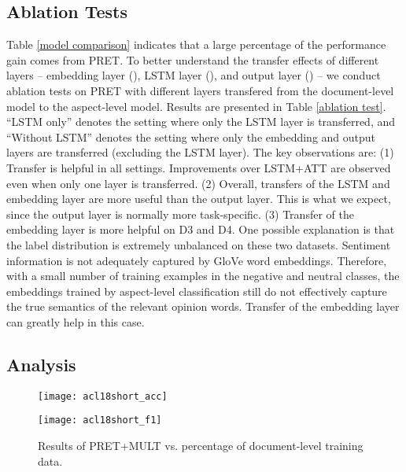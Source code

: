 \documentclass[11pt,a4paper]{article}
\begin{document}
\subsection{Ablation Tests}
Table \ref{model comparison} indicates that a large percentage of the performance gain comes from PRET. To better understand the transfer effects of different layers -- embedding layer (), LSTM layer (), and output layer () -- we conduct ablation tests on PRET with different layers transfered from the document-level model to the aspect-level model. Results are presented in Table \ref{ablation test}. ``LSTM only'' denotes the setting where only the LSTM layer is transferred, and ``Without LSTM'' denotes the setting where only the embedding and output layers are transferred (excluding the LSTM layer). The key observations are: (1) Transfer is helpful in all settings. Improvements over LSTM+ATT are observed even when only one layer is transferred. (2) Overall, transfers of the LSTM and embedding layer are more useful than the output layer. This is what we expect, since the output layer is normally more task-specific. 
(3) Transfer of the embedding layer is more helpful on D3 and D4. One possible explanation is that the label distribution is extremely unbalanced on these two datasets. Sentiment information is not adequately captured by GloVe word embeddings. Therefore, with a small number of training examples in the negative and neutral classes, the embeddings trained by aspect-level classification still do not effectively capture the true semantics of the relevant opinion words. Transfer of the embedding layer can greatly help in this case.

\subsection{Analysis}

\begin{figure}[t]
  \centering
  \begin{minipage}[b]{0.37\textwidth}
    \texttt{[image: acl18short\_acc]}
  \end{minipage}
  \hfill
  \begin{minipage}[b]{0.37\textwidth}
    \texttt{[image: acl18short\_f1]}
  \end{minipage}
  \caption{Results of PRET+MULT vs. percentage of document-level training data.}
    \label{percentage}
\end{figure}
\end{document}
